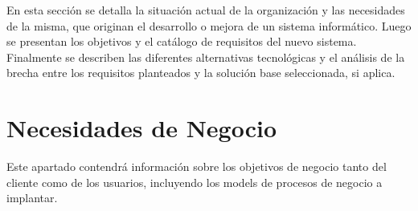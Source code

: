 

En esta sección se detalla la situación actual de la organización y las necesidades de la misma, que originan el desarrollo o mejora de un sistema informático. Luego se presentan los objetivos y el catálogo de requisitos del nuevo sistema. Finalmente se describen las diferentes alternativas tecnológicas y el análisis de la brecha entre los requisitos planteados y la solución base seleccionada, si aplica.





\section{Necesidades de Negocio}
Este apartado contendrá información sobre los objetivos de negocio tanto del cliente como de los usuarios, incluyendo los models de procesos de negocio a implantar.

